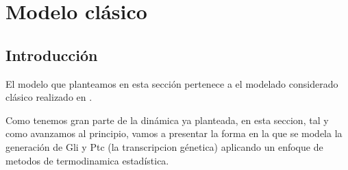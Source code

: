 
\chapter{Modelo clásico}

\label{ch:modelo_clasico}

\section{Introducción}
El modelo que planteamos en esta sección pertenece a el modelado considerado clásico realizado en \cite{schaffer}.

Como tenemos gran parte de la dinámica ya planteada, en esta seccion, tal y como avanzamos al principio, vamos a presentar la forma en la que se modela la generación de Gli y Ptc (la transcripcion génetica) aplicando un enfoque de metodos de termodinamica estadística.






